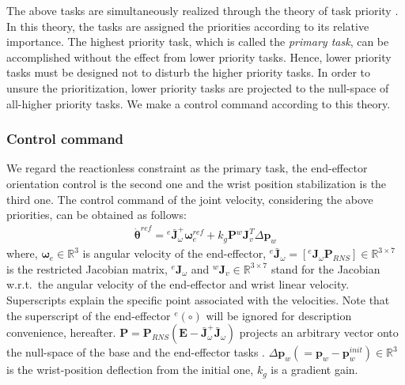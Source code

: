 \documentclass[preprint,12pt]{elsarticle}
\def\R#1{{\in\mathbb{R}^{#1}}}
\def\thd{{\dot{\bbm{\theta}}}}
\def\bbm#1{\bm{#1}}
\begin{document}
The above tasks are simultaneously realized through the theory of task priority \cite{Nakamura1987}.
In this theory,
the tasks are assigned the priorities according to its relative importance.
The highest priority task, which is called the \textit{primary task}, can be accomplished
without the effect from lower priority tasks.
Hence, lower priority tasks must be designed not to disturb the higher priority tasks.
In order to unsure the prioritization,
lower priority tasks are projected to the null-space of all-higher priority tasks.
We make a control command according to this theory.

\subsubsection{Control command}
\label{sec:CONTROLLER}
We regard the reactionless constraint as the primary task,
the end-effector orientation control is the second one and the wrist position stabilization is the third one.
The control command of the joint velocity, considering
the above priorities, can be obtained as follows:
%
\begin{align}
  \thd^{ref} = {}^{e}\bar{\bm{J}}_{\omega}^{+}\bm{\omega}_{e}^{ref} + k_{g}\bm{P}{}^{w}\bm{J}_{v}^{T}\Delta\bm{p}_{w}
  \label{eq:REF}
\end{align}
%
where,
$\bm{\omega}_{e}\R{3}$ is angular velocity of the end-effector,
${}^{e}\bar{\bm{J}}_{\omega} = [{}^{e}\bm{J}_{\omega}\bm{P}_{RNS}]\R{3 \times 7}$ is the restricted Jacobian matrix,
${}^{e}\bm{J}_{\omega}$ and
${}^{w}\bm{J}_{v}\R{3 \times 7}$ stand for the Jacobian w.r.t.\ the angular velocity of the end-effector
and wrist linear velocity.
Superscripts explain the specific point associated with the velocities.
Note that the superscript of the end-effector ${}^{e}(\circ)$ will be ignored for description convenience, hereafter.
$\bm{P} = \bm{P}_{RNS}(\bm{E} - \bar{\bm{J}}_{\omega}^{+}\bar{\bm{J}}_{\omega})$ projects
an arbitrary vector onto the null-space of the base and the end-effector tasks \cite{Dietrich2015}.
$\Delta\bm{p}_{w} (= \bm{p}_{w} - \bm{p}_{w}^{init})\R{3}$ is the wrist-position deflection from the initial one,
$k_{g}$ is a gradient gain.
\end{document}
